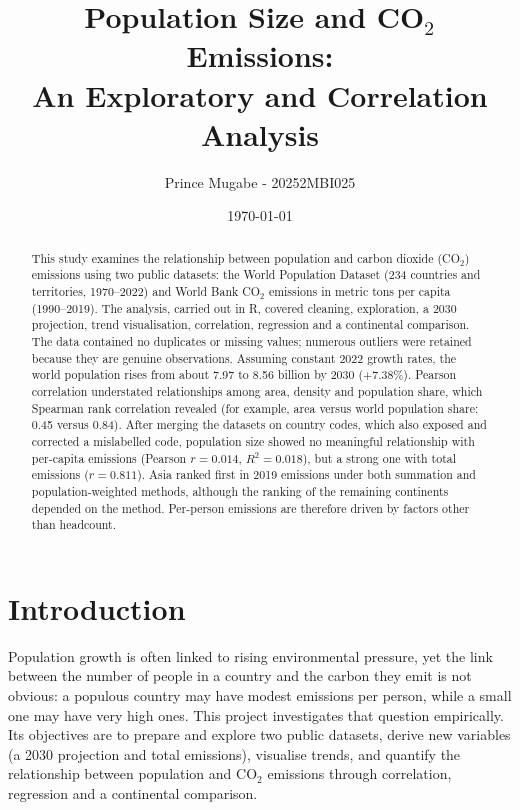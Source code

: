 \documentclass[11pt,a4paper]{article}
\title{\vspace{-1.2cm}\textbf{Population Size and CO$_2$ Emissions: \\ An Exploratory and Correlation Analysis}}
\author{Prince Mugabe - 20252MBI025}
\date{\today}
\begin{document}
	\maketitle
	\vspace{-0.9cm}
	
	\begin{abstract}
		\noindent
		This study examines the relationship between population and carbon dioxide (CO$_2$) emissions using two public datasets: the World Population Dataset (234 countries and territories, 1970--2022) and World Bank CO$_2$ emissions in metric tons per capita (1990--2019). The analysis, carried out in R, covered cleaning, exploration, a 2030 projection, trend visualisation, correlation, regression and a continental comparison. The data contained no duplicates or missing values; numerous outliers were retained because they are genuine observations. Assuming constant 2022 growth rates, the world population rises from about 7.97 to 8.56 billion by 2030 ($+7.38\%$). Pearson correlation understated relationships among area, density and population share, which Spearman rank correlation revealed (for example, area versus world population share: 0.45 versus 0.84). After merging the datasets on country codes, which also exposed and corrected a mislabelled code, population size showed no meaningful relationship with per-capita emissions (Pearson $r=0.014$, $R^2=0.018$), but a strong one with total emissions ($r=0.811$). Asia ranked first in 2019 emissions under both summation and population-weighted methods, although the ranking of the remaining continents depended on the method. Per-person emissions are therefore driven by factors other than headcount.
		
	\end{abstract}
	
	\section{Introduction}
	Population growth is often linked to rising environmental pressure, yet the link between the number of people in a country and the carbon they emit is not obvious: a populous country may have modest emissions per person, while a small one may have very high ones. This project investigates that question empirically. Its objectives are to prepare and explore two public datasets, derive new variables (a 2030 projection and total emissions), visualise trends, and quantify the relationship between population and CO$_2$ emissions through correlation, regression and a continental comparison.
	
\end{document}
